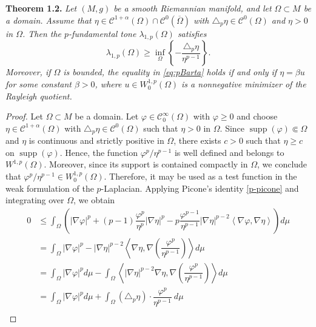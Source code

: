 \documentclass{article}
\begin{document}
\medskip
\noindent \textbf{Theorem 1.2.} \textit{Let $(M,g)$ be a smooth Riemannian manifold, and let $\Omega \subset M$ be a domain. Assume that $\eta \in \mathcal{C}^{1+\alpha}(\Omega)\cap\mathcal{C}^{0}(\overline{\Omega})$ with $\triangle_p \eta \in\mathcal{C}^0(\Omega)$
and $\eta>0$ in $\Omega$.
Then the $p$-fundamental tone $\lambda_{1,p}(\Omega)$ satisfies
\begin{equation}\label{eq:pBarta}
\lambda_{1,p}(\Omega)
\ge
\inf_{\Omega}
\left\{
-\frac{\triangle_p \eta}{\eta^{p-1}}
\right\}.
\end{equation}
Moreover, if $\Omega$ is bounded, the equality in \eqref{eq:pBarta}
holds if and only if $\eta=\beta u$ for some constant $\beta>0$,
where $u \in W^{1,p}_0(\Omega)$ is a nonnegative minimizer of the Rayleigh quotient.
}
\begin{proof} Let $\Omega \subset M$ be a domain. Let $\varphi \in \mathcal{C}_0^{\infty}(\Omega)$ with $\varphi \ge 0$ and choose $\eta \in \mathcal{C}^{1+\alpha}(\Omega)$ with $\triangle_p \eta \in \mathcal{C}^{0}(\Omega)$ such that $\eta > 0$ in $\Omega$. Since $\operatorname{supp}(\varphi) \Subset \Omega$ and $\eta$ is continuous and strictly positive in $\Omega$, there exists $c>0$ such that $\eta \ge c$ on $\operatorname{supp}(\varphi)$. Hence, the function $\varphi^p/\eta^{p-1}$ is well defined and belongs to $W^{1,p}(\Omega)$. Moreover, since its support is contained compactly in $\Omega$, we conclude that $\varphi^p/\eta^{p-1} \in W_0^{1,p}(\Omega)$. Therefore, it may be used as a test function in the weak formulation of the $p$-Laplacian. Applying Picone’s identity \eqref{p-picone} and integrating over $\Omega$, we obtain
\begin{equation}\label{huang&allegeto1}
\begin{aligned}
   0 &\leq  \int_{\Omega} \left( | \nabla \varphi |^p + (p-1)\dfrac{ \varphi^p}{\eta^p} | \nabla \eta |^p - p \dfrac{ \varphi^{p-1}}{\eta^{p-1}} | \nabla \eta |^{p-2} \left\langle \nabla  \varphi, \nabla \eta \right\rangle \right)  d\mu \\
   &=\int_{\Omega} | \nabla \varphi |^p - | \nabla \eta |^{p-2} \left\langle \nabla \eta, \nabla \left( \dfrac{ \varphi^p}{\eta^{p-1}} \right) \right\rangle d\mu \\
   &= \int_{\Omega} | \nabla \varphi |^p d\mu - \int_{\Omega} \left\langle | \nabla \eta |^{p-2} \nabla \eta, \nabla \left( \dfrac{ \varphi^p}{\eta^{p-1}} \right) \right\rangle d\mu \\
    &= \int_{\Omega} | \nabla \varphi |^p d\mu + \int_{\Omega}(\triangle_p \eta ) \cdot \dfrac{ \varphi^p}{\eta^{p-1}} \ d\mu  \\

\end{aligned}
\end{equation}
\end{proof}
\end{document}
